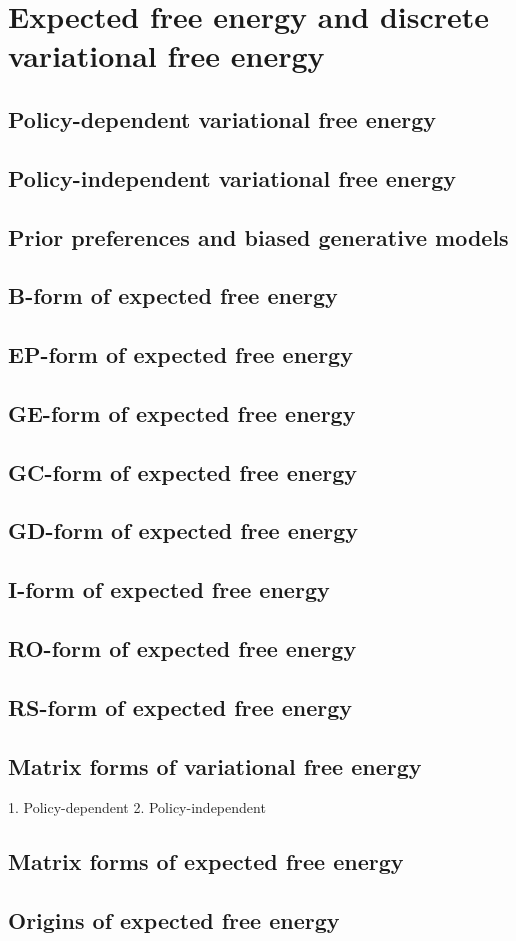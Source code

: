 \chapter{Expected free energy and discrete variational free energy}

\section{Policy-dependent variational free energy}
\section{Policy-independent variational free energy}
\section{Prior preferences and biased generative models}
\section{B-form of expected free energy}
\section{EP-form of expected free energy}
\section{GE-form of expected free energy}
\section{GC-form of expected free energy}
\section{GD-form of expected free energy}
\section{I-form of expected free energy}
\section{RO-form of expected free energy}
\section{RS-form of expected free energy}
\section{Matrix forms of variational free energy}
    1. Policy-dependent
    2. Policy-independent
\section{Matrix forms of expected free energy}
\section{Origins of expected free energy}